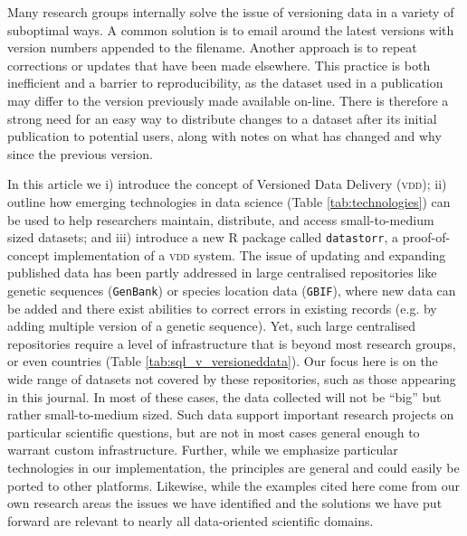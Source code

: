 \documentclass[a4paper,11pt]{article}
\begin{document}
Many research groups internally solve the issue of versioning data in a variety of suboptimal ways. A common solution is to email around the latest versions with version numbers appended to the filename. Another approach is to repeat corrections or updates that have been made elsewhere. This practice is both inefficient and a barrier to reproducibility, as the dataset used in a publication may differ to the version previously made available on-line. There is therefore a strong need for an easy way to distribute changes to a dataset after its initial publication to potential users, along with notes on what has changed and why since the previous version.

In this article we i) introduce the concept of Versioned Data Delivery (\textsc{vdd}); ii) outline how emerging technologies in data science (Table \ref{tab:technologies}) can be used to help researchers maintain, distribute, and access small-to-medium sized datasets; and iii) introduce a new \textsc{R} package called \texttt{datastorr}, a proof-of-concept implementation of a \textsc{vdd} system. The issue of updating and expanding published data has been partly addressed in large centralised repositories like genetic sequences (\texttt{GenBank}) or species location data (\texttt{GBIF}), where new data can be added and there exist abilities to correct errors in existing records (e.g. by adding multiple version of a genetic sequence). Yet, such large centralised repositories require a level of infrastructure that is beyond most research groups, or even countries (Table \ref{tab:sql_v_versioneddata}). Our focus here is on the wide range of datasets not covered by these repositories, such as those appearing in this journal. In most of these cases, the data collected will not be ``big'' but rather small-to-medium sized. Such data support important research projects on particular scientific questions, but are not in most cases general enough to warrant custom infrastructure. Further, while we emphasize particular technologies in our implementation, the principles are general and could easily be ported to other platforms. Likewise, while the examples cited here come from our own research areas the issues we have identified and the solutions we have put forward are relevant to nearly all data-oriented scientific domains.


\end{document}
